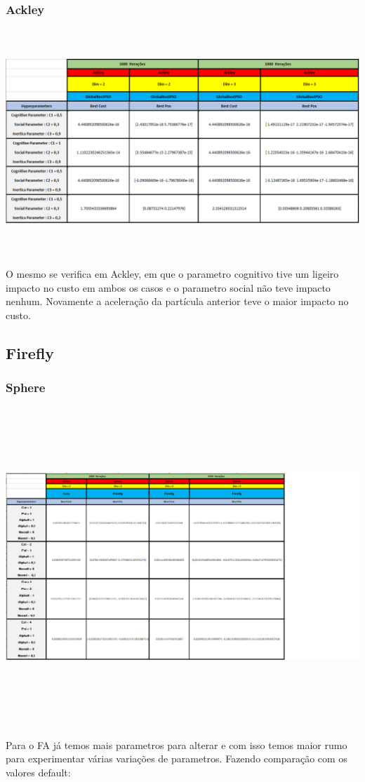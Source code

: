 \documentclass[10pt]{article}
\begin{document}
\subsubsection{Ackley}\label{sec:PSO-Ackley}
\begin{center}
  \includegraphics[height=8.5cm]{img/PSOackley.png}
\end{center}
O mesmo se verifica em Ackley, em que o parametro
cognitivo tive um ligeiro impacto no custo em ambos os casos 
e o parametro social não teve impacto nenhum.
Novamente a aceleração da partícula anterior teve o maior
impacto no custo.

\subsection{Firefly}\label{sec:fire-res}
\subsubsection{Sphere}\label{sec:fire-sphere}
\begin{center}
  \includegraphics[height=12cm]{img/Fireflysphere.png}
\end{center}
Para o FA já temos mais parametros para alterar e com isso temos
maior rumo para experimentar várias variações de parametros.
Fazendo comparação com os valores default:
\end{document}
